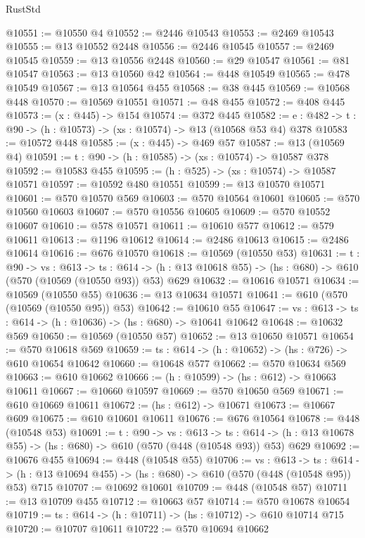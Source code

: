 \begin{lexlean}{RustStd}
\begin{coremodule}
@10551 := @10550 @4
@10552 := @2446 @10543
@10553 := @2469 @10543
@10555 := @13 @10552 @2448
@10556 := @2446 @10545
@10557 := @2469 @10545
@10559 := @13 @10556 @2448
@10560 := @29 @10547
@10561 := @81 @10547
@10563 := @13 @10560 @42
@10564 := @448 @10549
@10565 := @478 @10549
@10567 := @13 @10564 @455
@10568 := @38 @445
@10569 := @10568 @448
@10570 := @10569 @10551
@10571 := @48 @455
@10572 := @408 @445
@10573 := (x : @445) -> @154
@10574 := @372 @445
@10582 := {e : @482} -> {t : @90} -> (h : @10573) -> (xs : @10574) -> @13 (@10568 @53 @4) @378
@10583 := @10572 @448
@10585 := (x : @445) -> @469 @57
@10587 := @13 (@10569 @4)
@10591 := {t : @90} -> (h : @10585) -> (xs : @10574) -> @10587 @378
@10592 := @10583 @455
@10595 := (h : @525) -> (xs : @10574) -> @10587 @10571
@10597 := @10592 @480 @10551
@10599 := @13 @10570 @10571
@10601 := @570 @10570 @569
@10603 := @570 @10564 @10601
@10605 := @570 @10560 @10603
@10607 := @570 @10556 @10605
@10609 := @570 @10552 @10607
@10610 := @578 @10571
@10611 := @10610 @577
@10612 := @579 @10611
@10613 := @1196 @10612
@10614 := @2486 @10613
@10615 := @2486 @10614
@10616 := @676 @10570
@10618 := @10569 (@10550 @53)
@10631 := {t : @90} ->
  {vs : @613} ->
  {ts : @614} -> (h : @13 @10618 @55) -> (hs : @680) -> @610 (@570 (@10569 (@10550 @93)) @53) @629
@10632 := @10616 @10571
@10634 := @10569 (@10550 @55)
@10636 := @13 @10634 @10571
@10641 := @610 (@570 (@10569 (@10550 @95)) @53)
@10642 := @10610 @55
@10647 := {vs : @613} -> {ts : @614} -> (h : @10636) -> (hs : @680) -> @10641 @10642
@10648 := @10632 @569
@10650 := @10569 (@10550 @57)
@10652 := @13 @10650 @10571
@10654 := @570 @10618 @569
@10659 := {ts : @614} -> (h : @10652) -> (hs : @726) -> @610 @10654 @10642
@10660 := @10648 @577
@10662 := @570 @10634 @569
@10663 := @610 @10662
@10666 := (h : @10599) -> (hs : @612) -> @10663 @10611
@10667 := @10660 @10597
@10669 := @570 @10650 @569
@10671 := @610 @10669 @10611
@10672 := (hs : @612) -> @10671
@10673 := @10667 @609
@10675 := @610 @10601 @10611
@10676 := @676 @10564
@10678 := @448 (@10548 @53)
@10691 := {t : @90} ->
  {vs : @613} ->
  {ts : @614} -> (h : @13 @10678 @55) -> (hs : @680) -> @610 (@570 (@448 (@10548 @93)) @53) @629
@10692 := @10676 @455
@10694 := @448 (@10548 @55)
@10706 := {vs : @613} ->
  {ts : @614} -> (h : @13 @10694 @455) -> (hs : @680) -> @610 (@570 (@448 (@10548 @95)) @53) @715
@10707 := @10692 @10601
@10709 := @448 (@10548 @57)
@10711 := @13 @10709 @455
@10712 := @10663 @57
@10714 := @570 @10678 @10654
@10719 := {ts : @614} -> (h : @10711) -> (hs : @10712) -> @610 @10714 @715
@10720 := @10707 @10611
@10722 := @570 @10694 @10662

\end{coremodule}
\end{lexlean}

